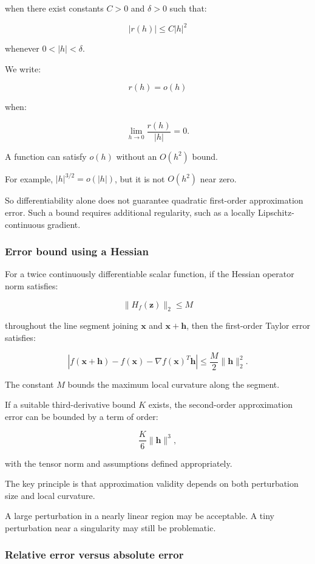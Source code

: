 when there exist constants \(C>0\) and \(\delta>0\) such that:

\[
|r(h)|\le C|h|^2
\]

whenever \(0<|h|<\delta\).

We write:

\[
r(h)=o(h)
\]

when:

\[
\lim_{h\to0}\frac{r(h)}{|h|}=0.
\]

A function can satisfy \(o(h)\) without an \(O(h^2)\) bound.

For example, \(|h|^{3/2}=o(|h|)\), but it is not \(O(h^2)\) near zero.

So differentiability alone does not guarantee quadratic first-order approximation error. Such a bound requires additional regularity, such as a locally Lipschitz-continuous gradient.

\subsubsection{Error bound using a Hessian}\label{02-foundations-ii-ch021-error-bound-using-a-hessian}

For a twice continuously differentiable scalar function, if the Hessian operator norm satisfies:

\[
\|H_f(\mathbf z)\|_2\le M
\]

throughout the line segment joining \(\mathbf x\) and \(\mathbf x+\mathbf h\), then the first-order Taylor error satisfies:

\[
\boxed{ \left| f(\mathbf x+\mathbf h) -f(\mathbf x) -\nabla f(\mathbf x)^T\mathbf h \right| \le \frac M2\|\mathbf h\|_2^2 }.
\]

The constant \(M\) bounds the maximum local curvature along the segment.

If a suitable third-derivative bound \(K\) exists, the second-order approximation error can be bounded by a term of order:

\[
\frac K6\|\mathbf h\|^3,
\]

with the tensor norm and assumptions defined appropriately.

The key principle is that approximation validity depends on both perturbation size and local curvature.

A large perturbation in a nearly linear region may be acceptable. A tiny perturbation near a singularity may still be problematic.

\subsubsection{Relative error versus absolute error}\label{02-foundations-ii-ch021-relative-error-versus-absolute-error}

